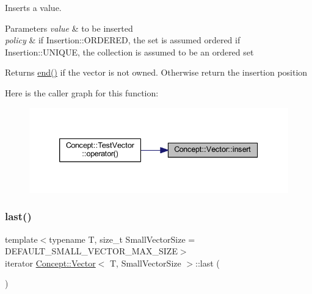 Inserts a value. 
\begin{DoxyParams}{Parameters}
{\em value} & to be inserted \\
\hline
{\em policy} & if Insertion\+::\+O\+R\+D\+E\+R\+ED, the set is assumed ordered if Insertion\+::\+U\+N\+I\+Q\+UE, the collection is assumed to be an ordered set \\
\hline
\end{DoxyParams}
\begin{DoxyReturn}{Returns}
\mbox{\hyperlink{class_concept_1_1_vector_acf6f0b48aa0ecbd09e327d6b173d9ed8}{end()}} if the vector is not owned. Otherwise return the insertion position 
\end{DoxyReturn}
Here is the caller graph for this function\+:\nopagebreak
\begin{figure}[H]
\begin{center}
\leavevmode
\includegraphics[width=339pt]{class_concept_1_1_vector_abda5f983b8e539a72ea93e1a051d2b9c_icgraph}
\end{center}
\end{figure}
\mbox{\label{class_concept_1_1_vector_a27a72907afb7223fe8a4f892000c8322}} 
\subsubsection{\texorpdfstring{last()}{last()}\hspace{0.1cm}{\footnotesize\ttfamily [1/2]}}
{\footnotesize\ttfamily template$<$typename T, size\+\_\+t Small\+Vector\+Size = D\+E\+F\+A\+U\+L\+T\+\_\+\+S\+M\+A\+L\+L\+\_\+\+V\+E\+C\+T\+O\+R\+\_\+\+M\+A\+X\+\_\+\+S\+I\+ZE$>$ \\
iterator \mbox{\hyperlink{class_concept_1_1_vector}{Concept\+::\+Vector}}$<$ T, Small\+Vector\+Size $>$\+::last (\begin{DoxyParamCaption}{ }\end{DoxyParamCaption})\hspace{0.3cm}{\ttfamily [inline]}}

